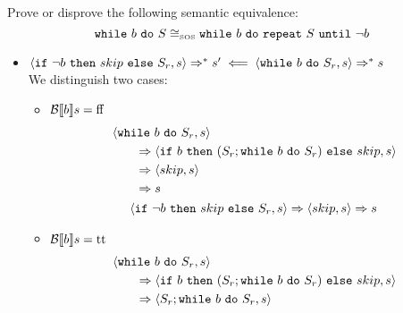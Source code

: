 \begin{exercise}{
    Prove or disprove the following semantic equivalence:
    \[ \texttt{while}\ b\ \texttt{do}\ S \cong_{\text{\tiny SOS}} \texttt{while}\ b\ \texttt{do}\ \texttt{repeat}\ S\ \texttt{until}\ \neg b  \]\vspace*{-0.6cm}
}
\begin{itemize}
\begin{itemize}
                \begin{align*}
                    &\instr{\wwhile{b}{S}_r}{s}
                    \\&\qquad\Rightarrow \instr{\wif{b}{(S_r; \wwhile{b}{S_r})}{skip}}{s}
                    \\&\qquad\Rightarrow \instr{S_r; \wwhile{b}{S}_r}{s}
                    \qquad\qquad\text{(By composition lemma)}
                    \\&\qquad\Rightarrow^* \instr{\wwhile{b}{S}_r}{s'}
                    \\&\qquad\Rightarrow \instr{\wif{b}{(S_r; \wwhile{b}{S_r})}{skip}}{s'}
                    \\&\qquad\Rightarrow \instr{skip}{s'}
                    \\&\qquad\Rightarrow s'
                \end{align*}
            \end{itemize}
        \item $\left<\texttt{if}\ \neg b\ \texttt{then}\ skip\ \texttt{else}\ S_r, s\right> \Rightarrow^* s' \impliedby \left<\texttt{while}\ b\ \texttt{do}\ S_r, s\right> \Rightarrow^* s$ \\
            We distinguish two cases:\begin{itemize}
                \item $\mathcal{B} \llbracket b \rrbracket s = \text{ff}$
                \begin{gather*}
                    \begin{align*}
                        &\left<\texttt{while}\ b\ \texttt{do}\ S_r, s\right>
                        \\&\qquad\Rightarrow \left<\texttt{if}\ b\ \texttt{then}\ (S_r; \texttt{while}\ b\ \texttt{do}\ S_r)\ \texttt{else}\ skip, s\right>
                        \\&\qquad\Rightarrow \left<skip, s\right>
                        \\&\qquad\Rightarrow s
                    \end{align*}
                    \\
                    \left<\texttt{if}\ \neg b\ \texttt{then}\ skip\ \texttt{else}\ S_r, s\right>
                    \Rightarrow
                    \left<skip, s\right>
                    \Rightarrow s
                \end{gather*}
                \item $\mathcal{B} \llbracket b \rrbracket s = \text{tt}$
                \begin{align*}
                    &\instr{\wwhile{b}{S}_r}{s}
                    \\&\qquad\Rightarrow \instr{\wif{b}{(S_r; \wwhile{b}{S_r})}{skip}}{s}
                    \\&\qquad\Rightarrow \instr{S_r; \wwhile{b}{S}_r}{s}

\end{align*}
\end{itemize}
\end{itemize}
\end{exercise}
